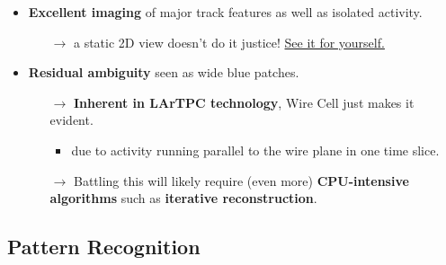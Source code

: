 \documentclass[xcolor=dvipsnames]{beamer}
\begin{document}
\begin{frame}[fragile]
  \footnotesize
  \begin{itemize}
  \item \textbf{Excellent imaging} of major track features as well as isolated
    activity.
    \begin{itemize}\scriptsize
    \item[$\rightarrow$] a static 2D view doesn't do it justice!  \href{http://www.phy.bnl.gov/wire-cell/bee/set/6/event/0/}{See it for yourself.}
    \end{itemize}
  \item \textbf{Residual ambiguity} seen as wide blue patches.
    \begin{itemize}\scriptsize
    \item[$\rightarrow$] \textbf{Inherent in LArTPC technology}, Wire Cell just makes it evident.
      \begin{itemize}\scriptsize
      \item due to activity running parallel to the wire plane in one time slice.
      \end{itemize}
    \item[$\rightarrow$] Battling this will likely require (even more)
      \textbf{CPU-intensive algorithms} such as \textbf{iterative
      reconstruction}.
    \end{itemize}
  \end{itemize}
\end{frame}


\subsection{Pattern Recognition}
\end{document}
